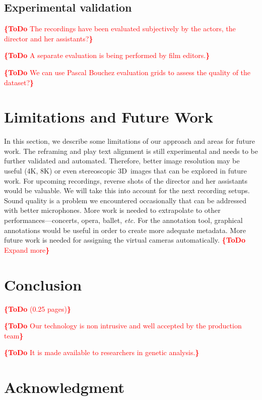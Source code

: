 \documentclass[conference]{IEEEtran}
\newcommand{\todo}[1]{\noindent\textcolor{red}{{\bf \{ToDo} #1{\bf \}}}}
\begin{document}
\subsection{Experimental validation}
\todo{The recordings have been evaluated subjectively by the actors, the director and her assistants?}

\todo{A separate evaluation is being performed by film editors.}

\todo{We can use Pascal Bouchez evaluation grids to assess the quality of the dataset?}


\section{Limitations and Future  Work}

In this section, we describe some limitations of our approach and areas for future work.
The reframing and play text alignment is still experimental
and needs to be further validated and automated.
Therefore, better image resolution may be useful (4K, 8K)
or even stereoscopic 3D~images that can be explored in future work.
For upcoming recordings, reverse shots of the director and her assistants would be valuable.
We will take this into account for the next recording setups.
Sound quality is a problem we encountered occasionally that can be addressed with better microphones.
More work is needed to extrapolate to other performances---concerts, opera, ballet, \emph{etc.}
For the annotation tool, graphical annotations would be useful
in order to create more adequate metadata.
More future work is needed for assigning the virtual cameras automatically.
\todo{Expand more}

\section{Conclusion}
\todo{(0.25 pages)}

\todo{Our technology is non intrusive and well accepted by the production team}

\todo{It is made available to researchers in genetic analysis.}

 

\section*{Acknowledgment}
\end{document}
